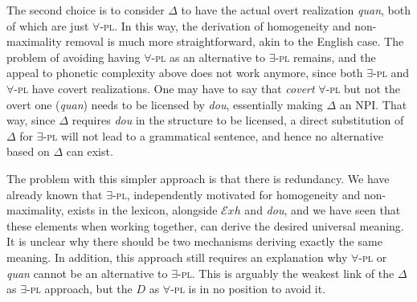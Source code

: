 \documentclass[12pt]{article}
\newcommand{\Exh}{\ensuremath{\mathcal{E}\mathit{xh}}}
\begin{document}
The second choice is to consider \(\Delta\) to have the actual overt realization \emph{quan}, both of which are just \(\forall\)-\textsc{pl}.
%
In this way, the derivation of homogeneity and non-maximality removal is much more straightforward, akin to the English case.
%
%
The problem of avoiding having \(\forall\)-\textsc{pl} as an alternative to \(\exists\)-\textsc{pl} remains, and the appeal to phonetic complexity above does not work anymore, since both \(\exists\)-\textsc{pl} and \(\forall\)-\textsc{pl} have covert realizations.
One may have to say that \emph{covert} \(\forall\)-\textsc{pl} but not the overt one (\emph{quan}) needs to be licensed by \emph{dou}, essentially making \(\Delta\) an NPI.
That way, since \(\Delta\) requires \emph{dou} in the structure to be licensed, a direct substitution of \(\Delta\) for \(\exists\)-\textsc{pl} will not lead to a grammatical sentence, and hence no alternative based on \(\Delta\) can exist.

The problem with this simpler approach is that there is redundancy. 
We have already known that \(\exists\)-\textsc{pl}, independently motivated for homogeneity and non-maximality, exists in the lexicon, alongside {\Exh} and \emph{dou}, and we have seen that these elements when working together, can derive the desired universal meaning.
It is unclear why there should be two mechanisms deriving exactly the same meaning.
In addition, this approach still requires an explanation why \(\forall\)-\textsc{pl} or \emph{quan} cannot be an alternative to \(\exists\)-\textsc{pl}.
This is arguably the weakest link of the \(\Delta\) as \(\exists\)-\textsc{pl} approach, but the \(D\) as \(\forall\)-\textsc{pl} is in no position to avoid it.
\end{document}
